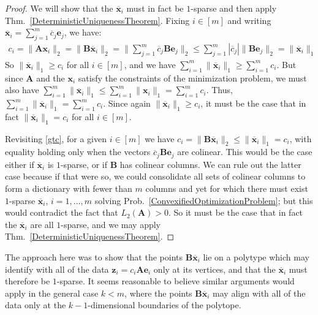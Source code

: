 \begin{proof}
We will show that the $\mathbf{\overline x}_i$ must in fact be $1$-sparse and then apply Thm.~\ref{DeterministicUniquenessTheorem}. Fixing $i \in [m]$ and writing $\mathbf{\overline x}_i = \sum_{j=1}^m \overline c_{j} \mathbf{e}_j$, we have:
\begin{align}\label{gtc}
c_i = \|\mathbf{Ax}_i\|_2 = \|\mathbf{B \overline x}_i\|_2 = \|\sum_{j=1}^m \overline c_{j} \mathbf{Be}_j\|_2 \leq \sum_{j=1}^m |\overline c_{j}| \|\mathbf{Be}_j\|_2 = \|\mathbf{\overline x}_i\|_1
\end{align}
So $\|\mathbf{\overline x}_i\|_1 \geq c_i$ for all $i \in [m]$, and we have $\sum_{i=1}^m \|\mathbf{\overline x}_i\|_1 \geq \sum_{i=1}^m  c_i$. But since $\mathbf{A}$ and the $\mathbf{x}_i$ satisfy the constraints of the minimization problem, we must also have $\sum_{i=1}^m \|\mathbf{\overline x}_i\|_1 \leq \sum_{i=1}^m \|\mathbf{x}_i\|_1 = \sum_{i=1}^m  c_i$. Thus, $\sum_{i=1}^m \|\mathbf{\overline x}_i\|_1 = \sum_{i=1}^m  c_i$. Since again $\|\mathbf{\overline x}_i\|_1 \geq c_i$, it must be the case that in fact $\| \mathbf{\overline x}_i\|_1 = c_i$ for all $i \in [m]$.

Revisiting \eqref{gtc}, for a given $i \in [m]$ we have $c_i = \|\mathbf{B\overline x}_i\|_2 \leq \|\mathbf{\overline x}_i\|_1 = c_i$, with equality holding only when the vectors $\overline c_j \mathbf{Be}_j$ are colinear. This would be the case either if $\mathbf{\overline x}_i$ is $1$-sparse, or if $\mathbf{B}$ has colinear columns. We can rule out the latter case because if that were so, we could consolidate all sets of colinear columns to form a dictionary with fewer than $m$ columns and yet for which there must exist $1$-sparse $\mathbf{\overline x}_i$, $i = 1, \ldots, m$ solving Prob.~\ref{ConvexifiedOptimizationProblem}; but this would contradict the fact that $L_2(\mathbf{A}) > 0$. So it must be the case that in fact the $\mathbf{\overline x}_i$ are all $1$-sparse, and we may apply Thm.~\ref{DeterministicUniquenessTheorem}.
\end{proof}

The approach here was to show that the points $\mathbf{B \overline x}_i$ lie on a polytype which may identify with all of the data $\mathbf{z}_i = c_i\mathbf{Ae}_i$ only at its vertices, and that the $\mathbf{\overline x}_i$ must therefore be $1$-sparse. It seems reasonable to believe similar arguments would apply in the general case $k < m$, where the points $\mathbf{B \overline x}_i$ may align with all of the data only at the $k-1$-dimensional boundaries of the polytope. 

